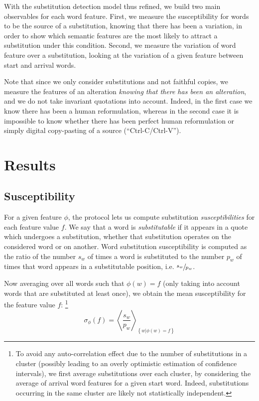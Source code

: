 With the substitution detection model thus refined, we build two main observables for each word feature.
First, we measure the susceptibility for words to be the source of a substitution, knowing that there has been a variation, in order to show which semantic features are the most likely to attract a substitution under this condition.
Second, we measure the variation of word feature over a substitution, looking at the variation of a given feature between start and arrival words.

Note that since we only consider substitutions and not faithful copies, we measure the features of an alteration \emph{knowing that there has been an alteration}, and we do not take invariant quotations into account.
Indeed, in the first case we know there has been a human reformulation, whereas in the second case it is impossible to know whether there has been perfect human reformulation or simply digital copy-pasting of a source (``{\sc Ctrl-C}/{\sc Ctrl-V}'').

\section{Results}\label{sec:results}

\subsection{Susceptibility}

For a given feature $\phi$, the protocol lets us compute substitution \emph{susceptibilities} for each feature value $f$.
We say that a word is \emph{substitutable} if it appears in a quote which undergoes a substitution, whether that substitution operates on the considered word or on another.
Word substitution susceptibility is computed as the ratio of the number $s_w$ of times a word is substituted to the number $p_w$ of times that word appears in a substitutable position, i.e. $\sfrac{s_w}{p_w}$.

Now averaging over all words such that $\phi(w) = f$ (only taking into account words that are substituted at least once), we obtain the mean susceptibility for the feature value $f$:
\footnote{To avoid any auto-correlation effect due to the number of substitutions in a cluster (possibly leading to an overly optimistic estimation of confidence intervals), we first average substitutions over each cluster, by considering the average of arrival word features for a given start word.
Indeed, substitutions occurring in the same cluster are likely not statistically independent.}
$$\sigma_{\phi}(f) = \left< \frac{s_w}{p_w} \right>_{\left\lbrace w | \phi(w) = f \right\rbrace}$$

